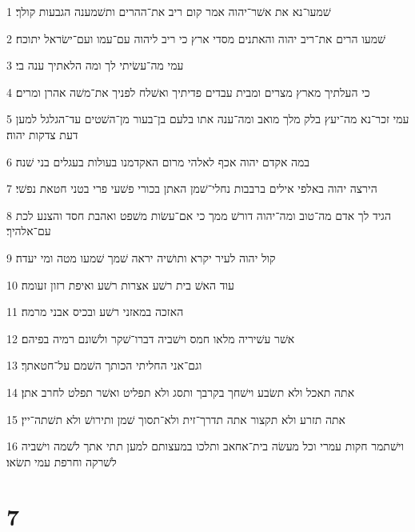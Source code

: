 \par 1 שׁמעו־נא את אשׁר־יהוה אמר קום ריב את־ההרים ותשׁמענה הגבעות קולך׃
\par 2 שׁמעו הרים את־ריב יהוה והאתנים מסדי ארץ כי ריב ליהוה עם־עמו ועם־ישׂראל יתוכח׃
\par 3 עמי מה־עשׂיתי לך ומה הלאתיך ענה בי׃
\par 4 כי העלתיך מארץ מצרים ומבית עבדים פדיתיך ואשׁלח לפניך את־משׁה אהרן ומרים׃
\par 5 עמי זכר־נא מה־יעץ בלק מלך מואב ומה־ענה אתו בלעם בן־בעור מן־השׁטים עד־הגלגל למען דעת צדקות יהוה׃
\par 6 במה אקדם יהוה אכף לאלהי מרום האקדמנו בעולות בעגלים בני שׁנה׃
\par 7 הירצה יהוה באלפי אילים ברבבות נחלי־שׁמן האתן בכורי פשׁעי פרי בטני חטאת נפשׁי׃
\par 8 הגיד לך אדם מה־טוב ומה־יהוה דורשׁ ממך כי אם־עשׂות משׁפט ואהבת חסד והצנע לכת עם־אלהיך׃
\par 9 קול יהוה לעיר יקרא ותושׁיה יראה שׁמך שׁמעו מטה ומי יעדה׃
\par 10 עוד האשׁ בית רשׁע אצרות רשׁע ואיפת רזון זעומה׃
\par 11 האזכה במאזני רשׁע ובכיס אבני מרמה׃
\par 12 אשׁר עשׁיריה מלאו חמס וישׁביה דברו־שׁקר ולשׁונם רמיה בפיהם׃
\par 13 וגם־אני החליתי הכותך השׁמם על־חטאתך׃
\par 14 אתה תאכל ולא תשׂבע וישׁחך בקרבך ותסג ולא תפליט ואשׁר תפלט לחרב אתן׃
\par 15 אתה תזרע ולא תקצור אתה תדרך־זית ולא־תסוך שׁמן ותירושׁ ולא תשׁתה־יין׃
\par 16 וישׁתמר חקות עמרי וכל מעשׂה בית־אחאב ותלכו במעצותם למען תתי אתך לשׁמה וישׁביה לשׁרקה וחרפת עמי תשׂאו׃

\chapter{7}


